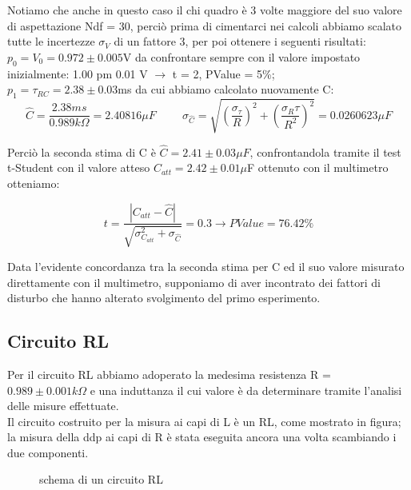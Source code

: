 \documentclass[a4paper]{article}
\theoremstyle{definition}
\begin{document}
\noindent Notiamo che anche in questo caso il chi quadro è 3 volte maggiore del suo valore di aspettazione Ndf = 30, perciò prima di cimentarci nei calcoli abbiamo scalato tutte le incertezze \(\sigma_{V}\) di un fattore 3, per poi ottenere i seguenti risultati: \\

\( p_{0} = V_{0} =  0.972 \pm 0.005\)V  da confrontare sempre con il valore impostato inizialmente: 1.00 pm 0.01 V \(\rightarrow\) t = 2, PValue = 5\%; \\

\(  p_{1} =  \tau_{RC} =   2.38 \pm 0.03\)ms da cui abbiamo calcolato nuovamente C: \\
\[\hat{C} = \frac{2.38ms}{0.989 k\Omega} =  2.40816  \mu F \hspace{1cm} \sigma_{\hat{C}} = \sqrt{\left(\frac{\sigma_{\tau}}{R}\right)^{2} + \left(\frac{\sigma_{R}\tau}{R^{2}} \right)^{2}} = 0.0260623 \mu F\]

\noindent Perciò la seconda stima di C è \(\hat{C} =  2.41 \pm 0.03 \mu F\), confrontandola tramite il test t-Student con il valore atteso \(C_{att} = 2.42 \pm 0.01 \mu\)F ottenuto con il multimetro otteniamo:

\[t = \frac{\left| C_{att} - \hat{C}\right|}{\sqrt{\sigma^{2}_{C_{att}} + \sigma_{\hat{C}}}} = 0.3 \rightarrow PValue = 76.42\%\]

\noindent Data l'evidente concordanza tra la seconda stima per C ed il suo valore misurato direttamente con il multimetro, supponiamo di aver incontrato dei fattori di disturbo che hanno alterato svolgimento del primo esperimento. 

\pagebreak

\subsection{Circuito RL}
\label{sec:circuitoRL}

Per il circuito RL abbiamo adoperato la medesima resistenza R = \(0.989 \pm 0.001 k\Omega\) e una induttanza il cui valore è da determinare tramite l'analisi delle misure effettuate. \\
Il circuito costruito per la misura ai capi di L è un RL, come mostrato in figura; la misura della ddp ai capi di R è stata eseguita ancora una volta scambiando i due componenti. \\


\begin{figure}[!ht]

	\caption{schema di un circuito RL}

    \label{fig:RL_schema}

\end{figure}
\end{document}
